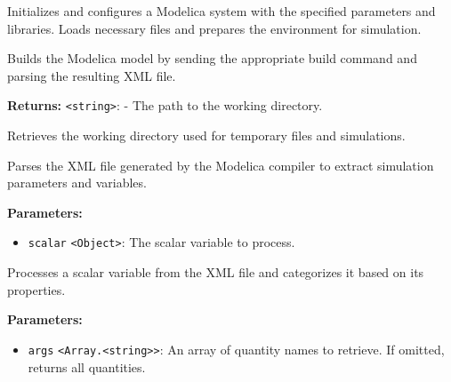 \documentclass[12pt,a4paper]{article}
\begin{document}
\noindent Initializes and configures a Modelica system with the specified parameters and libraries.
Loads necessary files and prepares the environment for simulation.

\vspace{5mm}
\noindent {}


\noindent Builds the Modelica model by sending the appropriate build command and parsing the resulting XML file.

\vspace{5mm}
\noindent {}


\noindent \textbf{Returns:} \texttt{<string>}: - The path to the working directory.

\noindent Retrieves the working directory used for temporary files and simulations.

\vspace{5mm}
\noindent {}


\noindent Parses the XML file generated by the Modelica compiler to extract simulation parameters and variables.

\vspace{5mm}
\noindent {}


\noindent \textbf{Parameters:}
\begin{itemize}
  \item \texttt{scalar} \texttt{<Object>}: The scalar variable to process.
\end{itemize}

\noindent Processes a scalar variable from the XML file and categorizes it based on its properties.

\vspace{5mm}
\noindent {}


\noindent \textbf{Parameters:}
\begin{itemize}
  \item \texttt{args} \texttt{<Array.<string>>}: An array of quantity names to retrieve. If omitted, returns all quantities.
\end{itemize}
\end{document}
